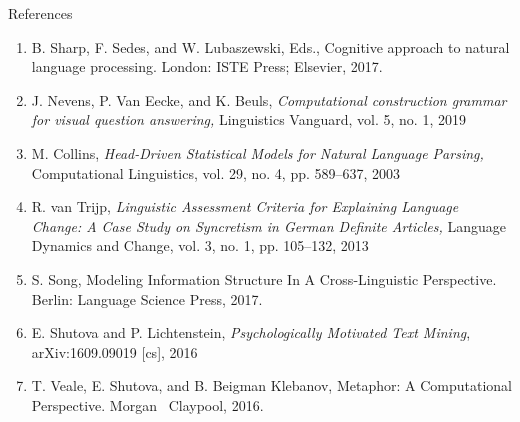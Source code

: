 \documentclass[aspectratio=169,cramped]{beamer}
\begin{document}
\begin{frame}{References}
  \vspace{-0.5cm}
  \begin{enumerate}
  \scriptsize
  \item B. Sharp, F. Sedes, and W. Lubaszewski, Eds., Cognitive approach to natural language processing. London: ISTE Press; Elsevier, 2017.
  \item J. Nevens, P. Van Eecke, and K. Beuls, \textit{Computational construction grammar for visual question answering,} Linguistics Vanguard, vol. 5, no. 1, 2019
  \item M. Collins, \textit{Head-Driven Statistical Models for Natural Language Parsing,} Computational Linguistics, vol. 29, no. 4, pp. 589--637, 2003
  \item R. van Trijp, \textit{Linguistic Assessment Criteria for Explaining Language Change: A Case Study on Syncretism in German Definite Articles,} Language Dynamics and Change, vol. 3, no. 1, pp. 105–132, 2013
  \item S. Song, Modeling Information Structure In A Cross-Linguistic Perspective. Berlin: Language Science Press, 2017.
  \item E. Shutova and P. Lichtenstein, \textit{Psychologically Motivated Text Mining},
    arXiv:1609.09019 [cs], 2016
  \item T. Veale, E. Shutova, and B. Beigman Klebanov, Metaphor: A Computational Perspective. Morgan \ Claypool, 2016.
  \end{enumerate}
\end{frame}
\end{document}
